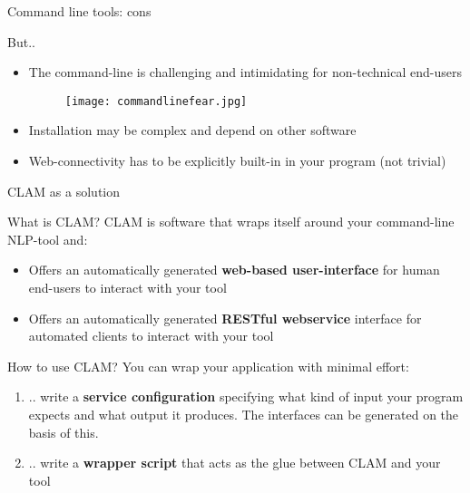 \documentclass[xcolor=table,10pt,t]{beamer}
\begin{document}
\begin{frame}{Command line tools: cons}
  \begin{block}{But..}
      \begin{itemize}
        \item The command-line is challenging and intimidating for non-technical end-users
        \begin{figure}
            \texttt{[image: commandlinefear.jpg]}
        \end{figure}
        \item<2-> Installation may be complex and depend on other software
        \item<2-> Web-connectivity has to be explicitly built-in in your program (not trivial)
      \end{itemize}
  \end{block}
\end{frame}


\begin{frame}{CLAM as a solution}
  \begin{block}{What is CLAM?}
      CLAM is software that wraps itself around your command-line NLP-tool and:
      
      \begin{itemize}
        \item Offers an automatically generated \textbf{web-based
          user-interface} for human end-users to interact with your tool
        \item Offers an automatically generated \textbf{RESTful webservice} interface for automated clients to interact with your tool
      \end{itemize}
  \end{block}

  \begin{block}{How to use CLAM?}
      You can wrap your application with minimal effort:
      
      \begin{enumerate}
        \item .. write a \textbf{service configuration} specifying what kind of input your
          program expects and what output it produces. The interfaces can be generated on the basis of this.
        \item .. write a \textbf{wrapper script} that acts as the glue between CLAM and your tool
      \end{enumerate}
      
  \end{block}
\end{frame}
\end{document}
